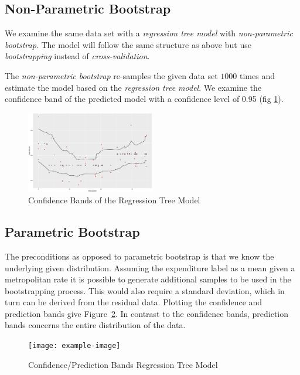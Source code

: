 \documentclass[a4paper, twocolumn]{article}
\begin{document}
    \subsection*{Non-Parametric Bootstrap}

        We examine the same data set with a \emph{regression tree model} with \emph{non-parametric bootstrap}. The model will follow the same structure as above but use \emph{bootstrapping} instead of \emph{cross-validation}.

        The \emph{non-parametric bootstrap} re-samples the given data set $1000$ times and estimate the model based on the \emph{regression tree model}. We examine the confidence band of the predicted model with a confidence level of 0.95 (fig \ref{fig:confidence_bands}).

        \begin{figure}[h!]
            \centering
            \caption{Confidence Bands of the Regression Tree Model}
            \label{fig:confidence_bands}
            \includegraphics[width=0.5\textwidth]{share/A1_nonparametric.eps}
        \end{figure}

    \subsection*{Parametric Bootstrap}

        The preconditions as opposed to parametric bootstrap is that we know the underlying given distribution. Assuming the expenditure label as a mean given a metropolitan rate it is possible to generate additional samples to be used in the bootstrapping process. This would also require a standard deviation, which in turn can be derived from the residual data. Plotting the confidence and prediction bands give Figure~\ref{fig:confpred_bands}. In contrast to the confidence bands, prediction bands concerns the entire distribution of the data.

        \begin{figure}[h!]
            \centering
            \caption{Confidence/Prediction Bands Regression Tree Model}
            \label{fig:confpred_bands}
            \texttt{[image: example-image]}
        \end{figure}
\end{document}
